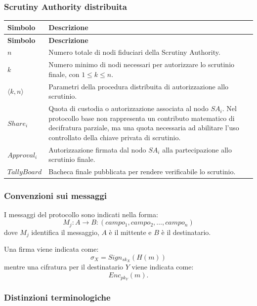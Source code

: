 \documentclass[a4paper,12pt]{article}
\begin{document}
\subsubsection{Scrutiny Authority distribuita}

\begin{longtable}{|>{\raggedright\arraybackslash}p{}|>{\raggedright\arraybackslash}p{}|}
	\hline
	\rowcolor{HeaderBlue}\textbf{Simbolo} & \textbf{Descrizione} \\
	\hline
	\endfirsthead
	\hline
	\rowcolor{HeaderBlue}\textbf{Simbolo} & \textbf{Descrizione} \\
	\hline
	\endhead
	$n$ & Numero totale di nodi fiduciari della Scrutiny Authority. \\
	\hline
	$k$ & Numero minimo di nodi necessari per autorizzare lo scrutinio finale, con \(1 \leq k \leq n\). \\
	\hline
	$\langle k,n \rangle$ & Parametri della procedura distribuita di autorizzazione allo scrutinio. \\
	\hline
	$Share_i$ & Quota di custodia o autorizzazione associata al nodo \(SA_i\). Nel protocollo base non rappresenta un contributo matematico di decifratura parziale, ma una quota necessaria ad abilitare l'uso controllato della chiave privata di scrutinio. \\
	\hline
	$Approval_i$ & Autorizzazione firmata dal nodo \(SA_i\) alla partecipazione allo scrutinio finale. \\
	\hline
	$TallyBoard$ & Bacheca finale pubblicata per rendere verificabile lo scrutinio. \\
	\hline
\end{longtable}



\subsubsection{Convenzioni sui messaggi}

I messaggi del protocollo sono indicati nella forma:
\[
	M_j : A \rightarrow B : (campo_1, campo_2, \dots, campo_n)
\]
dove $M_j$ identifica il messaggio, $A$ è il mittente e $B$ è il destinatario.

Una firma viene indicata come:
\[
	\sigma_X = Sign_{sk_X}(H(m))
\]
mentre una cifratura per il destinatario $Y$ viene indicata come:
\[
	Enc_{pk_Y}(m).
\]

\subsubsection{Distinzioni terminologiche}
\end{document}
